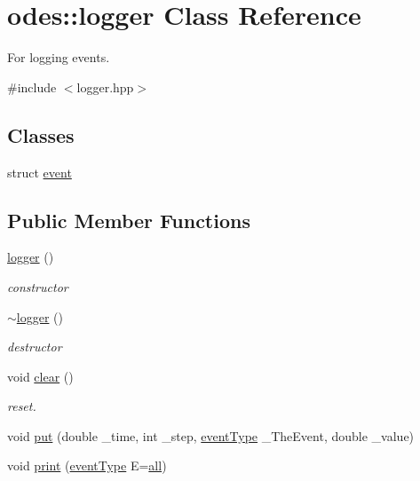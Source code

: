 \hypertarget{classodes_1_1logger}{}\section{odes\+:\+:logger Class Reference}
\label{classodes_1_1logger}


For logging events.  




{\ttfamily \#include $<$logger.\+hpp$>$}

\subsection*{Classes}
\begin{DoxyCompactItemize}
\item 
struct \hyperlink{structodes_1_1logger_1_1event}{event}
\end{DoxyCompactItemize}
\subsection*{Public Member Functions}
\begin{DoxyCompactItemize}
\item 
\hyperlink{classodes_1_1logger_a3c47645a906192af7e25a361291c0300}{logger} ()
\begin{DoxyCompactList}\small\item\em constructor \end{DoxyCompactList}\item 
\hyperlink{classodes_1_1logger_ab6deee9d915c1a6886b6c8c64fe7d867}{$\sim$logger} ()
\begin{DoxyCompactList}\small\item\em destructor \end{DoxyCompactList}\item 
void \hyperlink{classodes_1_1logger_a69c44a6b2f05e295a12a5d198e53f01c}{clear} ()
\begin{DoxyCompactList}\small\item\em reset. \end{DoxyCompactList}\item 
void \hyperlink{classodes_1_1logger_a2ff83aa375931c2e8aab3aaa3ec11d4a}{put} (double \+\_\+time, int \+\_\+step, \hyperlink{namespaceodes_a0e9924dcd4d2b0cedc36ec2eff4dcba8}{event\+Type} \+\_\+\+The\+Event, double \+\_\+value)
\item 
void \hyperlink{classodes_1_1logger_aaf2cd1d57a8190351882fa54fd9ae15f}{print} (\hyperlink{namespaceodes_a0e9924dcd4d2b0cedc36ec2eff4dcba8}{event\+Type} E=\hyperlink{namespaceodes_a0e9924dcd4d2b0cedc36ec2eff4dcba8ad985883a2a443d3b103d6b312caefef2}{all})
\end{DoxyCompactItemize}
